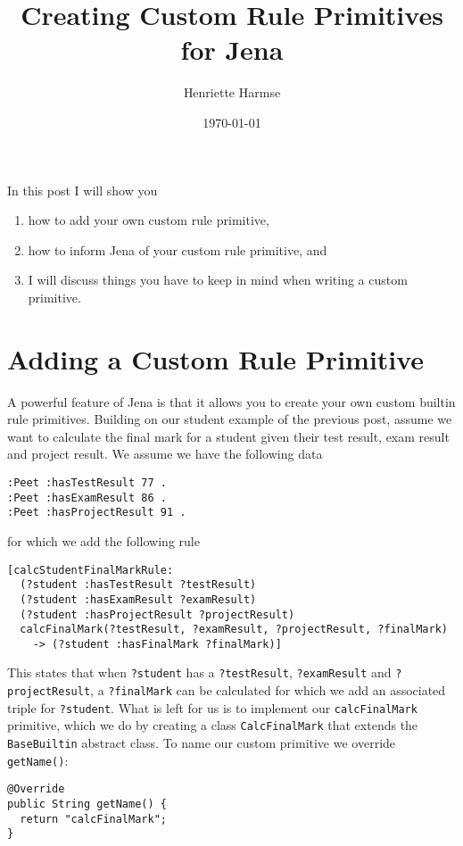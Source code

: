 \documentclass{amsart}
\title{Creating Custom Rule Primitives for Jena}
\author{Henriette Harmse}
\date{\today}
\begin{document}
  \maketitle
  
  In this post I will show you
  \begin{enumerate}
   \item how to add your own custom rule primitive, 
   \item how to inform Jena of your custom rule primitive, and 
   \item I will discuss things you have to keep in mind when writing a custom primitive. 
  \end{enumerate}

\section{Adding a Custom Rule Primitive}
A powerful feature of Jena is that it allows you to create your own custom builtin rule primitives. Building on our student example of the previous post, assume we want to calculate the final mark for a student given their test result, exam result and project result. We assume we have the following data

\begin{small}
\begin{verbatim}
:Peet :hasTestResult 77 .
:Peet :hasExamResult 86 .
:Peet :hasProjectResult 91 .
\end{verbatim}
\end{small}

for which we add the following rule 

\begin{small}
\begin{verbatim}
[calcStudentFinalMarkRule: 
  (?student :hasTestResult ?testResult) 
  (?student :hasExamResult ?examResult) 
  (?student :hasProjectResult ?projectResult) 
  calcFinalMark(?testResult, ?examResult, ?projectResult, ?finalMark)
    -> (?student :hasFinalMark ?finalMark)]
\end{verbatim}
\end{small}

This states that when \texttt{?student} has a \texttt{?testResult}, \texttt{?examResult} and \texttt{?projectResult}, a \texttt{?finalMark} can be calculated for which we add an associated triple for \texttt{?student}. What is left for us is to implement our \texttt{calcFinalMark} primitive, which we do by creating a class \texttt{CalcFinalMark} that extends the \texttt{BaseBuiltin} abstract class. To name our custom primitive we override \texttt{getName()}:
\begin{small}
\begin{verbatim}
@Override
public String getName() {
  return "calcFinalMark";
}
\end{verbatim}
\end{small}
\end{document}

